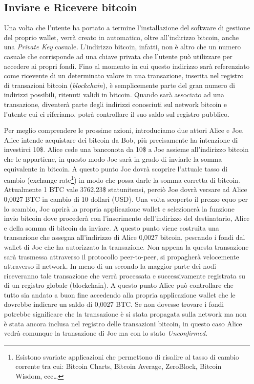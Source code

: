 \subsection*{Inviare e Ricevere bitcoin}
Una volta che l'utente ha portato a termine l'installazione del software di gestione del proprio wallet, verrà creato in automatico, oltre all'indirizzo bitcoin, anche una \textit{Private Key} casuale. L'indirizzo bitcoin, infatti, non è altro che un numero casuale che corrisponde ad una chiave privata che l'utente può utilizzare per accedere ai propri fondi. Fino al momento in cui questo indirizzo sarà referenziato come ricevente di un determinato valore in una transazione, inserita nel registro di transazioni bitcoin (\textit{blockchain}), è semplicemente parte del gran numero di indirizzi possibili, ritenuti validi in bitcoin. Quando sarà associato ad una transazione, diventerà parte degli indirizzi conosciuti sul network bitcoin e l'utente cui ci riferiamo, potrà controllare il suo saldo sul registro pubblico.

Per meglio comprendere le prossime azioni, introduciamo due attori Alice e Joe. Alice intende acquistare dei bitcoin da Bob, più precisamente ha intenzione di investirci 10\$. Alice cede una banconota da 10\$ a Joe assieme all'indirizzo bitcoin che le appartiene, in questo modo Joe sarà in grado di inviarle la somma equivalente in bitcoin. A questo punto Joe dovrà scoprire l'attuale tasso di cambio (exchange rate\footnote{Esistono svariate applicazioni che permettono di risalire al tasso di cambio corrente tra cui: Bitcoin Charts, Bitcoin Average, ZeroBlock, Bitcoin Wisdom, ecc\dots}) in modo che possa darle la somma corretta di bitcoin. Attualmente 1 BTC vale 3762,23\$ statunitensi, perciò Joe dovrà versare ad Alice 0,0027 BTC in cambio di 10 dollari (USD). Una volta scoperto il prezzo equo per lo scambio, Joe aprirà la propria applicazione wallet e selezionerà la funzione invio bitcoin dove procederà con l'inserimento dell'indirizzo del destinatario, Alice e della somma di bitcoin da inviare. A questo punto viene costruita una transazione che assegna all'indirizzo di Alice 0,0027 bitcoin, pescando i fondi dal wallet di Joe che ha autorizzato la transazione. Non appena la questa transazione sarà trasmessa attraverso il protocollo peer-to-peer, si propagherà velocemente attraverso il network. In meno di un secondo la maggior parte dei nodi riceveranno tale transazione che verrà processata e successivamente registrata su di un registro globale (blockchain). A questo punto Alice può controllare che tutto sia andato a buon fine accedendo alla propria applicazione wallet che le dovrebbe indicare un saldo di 0,0027 BTC. Se non dovesse trovare i fondi potrebbe significare che la transazione è si stata propagata sulla network ma non è stata ancora inclusa nel registro delle transazioni bitcoin, in questo caso Alice vedrà comunque la transazione di Joe ma con lo stato \textit{Unconfirmed}.

